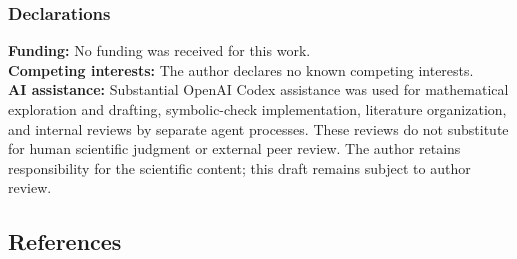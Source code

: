 \documentclass[
  11pt,
]{article}
\begin{document}
\subsubsection{Declarations}\label{declarations}

\textbf{Funding:} No funding was received for this work.\\
\textbf{Competing interests:} The author declares no known competing
interests.\\
\textbf{AI assistance:} Substantial OpenAI Codex assistance was used for
mathematical exploration and drafting, symbolic-check implementation,
literature organization, and internal reviews by separate agent
processes. These reviews do not substitute for human scientific judgment
or external peer review. The author retains responsibility for the
scientific content; this draft remains subject to author review.

\subsection{References}\label{references}
\end{document}
